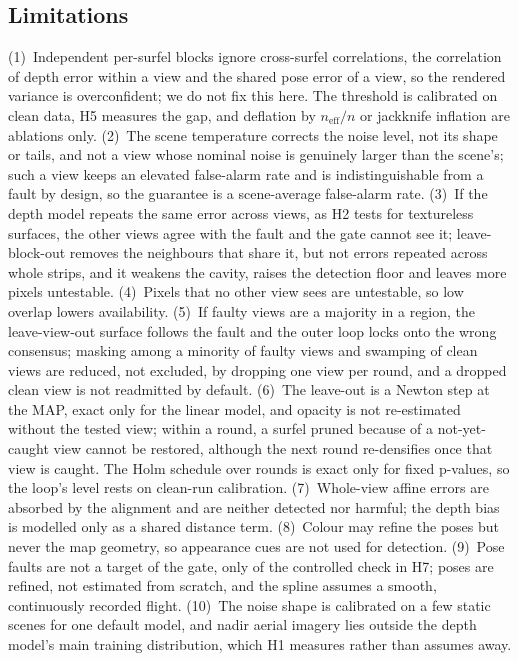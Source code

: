 \subsection{Limitations}
(1)~Independent per-surfel blocks ignore cross-surfel correlations, the correlation of depth error
within a view and the shared pose error of a view, so the rendered variance is overconfident; we do not
fix this here. The threshold is calibrated on clean data, H5 measures the gap, and deflation by
$n_{\mathrm{eff}}/n$ or jackknife inflation are ablations only. (2)~The scene temperature corrects the
noise level, not its shape or tails, and not a view whose nominal noise is genuinely larger than the
scene's; such a view keeps an elevated false-alarm rate and is indistinguishable from a fault by design,
so the guarantee is a scene-average false-alarm rate. (3)~If the depth model repeats the same error
across views, as H2 tests for textureless surfaces, the other views agree with the fault and the gate
cannot see it; leave-block-out removes the neighbours that share it, but not errors repeated across
whole strips, and it weakens the cavity, raises the detection floor and leaves more pixels untestable. (4)~Pixels that no other view sees are untestable, so low overlap lowers availability.
(5)~If faulty views are a majority in a region, the leave-view-out surface follows the fault and the
outer loop locks onto the wrong consensus; masking among a minority of faulty views and swamping of
clean views are reduced, not excluded, by dropping one view per round, and a dropped clean view is not
readmitted by default. (6)~The leave-out is a Newton step at the MAP, exact only for the linear model,
and opacity is not re-estimated without the tested view; within a round, a surfel pruned because of a
not-yet-caught view cannot be restored, although the next round re-densifies once that view is caught.
The Holm schedule over rounds is exact only for fixed p-values, so the loop's level rests on
clean-run calibration. (7)~Whole-view affine errors are absorbed by the alignment and are neither
detected nor harmful; the depth bias is modelled only as a shared distance term. (8)~Colour may refine the
poses but never the map geometry, so appearance cues are not used for detection. (9)~Pose faults are
not a target of the gate, only of the controlled check in H7; poses are refined, not estimated from scratch, and the spline assumes a smooth,
continuously recorded flight. (10)~The noise shape is calibrated on a few static scenes for one default
model, and nadir aerial imagery lies outside the depth model's main training distribution, which H1
measures rather than assumes away.


